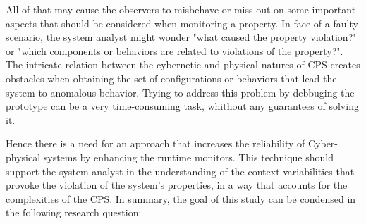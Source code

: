 All of that may cause the observers to misbehave or miss out on some important aspects that should be considered when monitoring a property. In face of a faulty scenario, the system analyst might wonder "what caused the property violation?" or "which components or behaviors are related to violations of the property?". The intricate relation between the cybernetic and physical natures of CPS creates obstacles when obtaining the set of configurations or behaviors that lead the system to anomalous behavior. Trying to address this problem by debbuging the prototype can be a very time-consuming task, whithout any guarantees of solving it.

Hence there is a need for an approach that increases the reliability of Cyber-physical systems by enhancing the runtime monitors. This technique should support the system analyst in the understanding of the context variabilities that provoke the violation of the system's properties, in a way that accounts for the complexities of the CPS. In summary, the goal of this study can be condensed in the following research question:

\vspace{0.5 cm}

\noindent{}
\vspace{0.3 cm}



